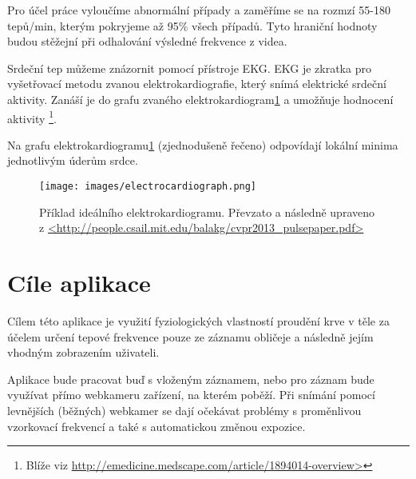 \documentclass[
  digital, %
  table,   %
%
  lof,     %
  lot,     %
]{fithesis3}
\begin{document}
Pro účel práce vyloučíme abnormální případy a zaměříme se na rozmzí 55-180 tepů/min, kterým pokryjeme až
95\% všech případů. Tyto hraniční hodnoty budou stěžejní při odhalování výsledné frekvence z videa.

Srdeční tep můžeme znázornit pomocí přístroje EKG. EKG je zkratka pro vyšetřovací metodu zvanou elektrokardiografie, který snímá elektrické srdeční aktivity. Zanáší je do grafu zvaného elektrokardiogram\ref{fig:electrocardiograph} a umožňuje hodnocení aktivity
\footnote{Blíže viz \url{http://emedicine.medscape.com/article/1894014-overview>}}.

Na grafu elektrokardiogramu\ref{fig:electrocardiograph} (zjednodušeně řečeno) odpovídají lokální minima jednotlivým úderům srdce.

\begin{figure}
  \begin{center}
    \texttt{[image: images/electrocardiograph.png]}
  \end{center}
  \caption{Příklad ideálního elektrokardiogramu. Převzato a následně upraveno z \url{<http://people.csail.mit.edu/balakg/cvpr2013_pulsepaper.pdf>}}
  \label{fig:electrocardiograph}
\end{figure}


\section{Cíle aplikace}
Cílem této aplikace je využití fyziologických vlastností proudění krve v těle za účelem určení tepové frekvence pouze ze záznamu obličeje a následně jejím vhodným zobrazením uživateli.

Aplikace bude pracovat buď s vloženým záznamem, nebo pro záznam bude využívat přímo webkameru zařízení, na kterém poběží. Při snímání pomocí levnějších (běžných) webkamer se dají očekávat problémy s proměnlivou vzorkovací frekvencí a také s automatickou změnou expozice.
\end{document}
